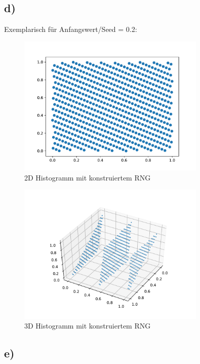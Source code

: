\subsection{d)}
Exemplarisch für Anfangswert/Seed = 0.2:

\begin{figure}[H]
  \centering
  \includegraphics[width=0.8\textwidth]{nr8_d_2D_seed=0.2.pdf}
  \caption{2D Histogramm mit konstruiertem RNG}
\end{figure}

\begin{figure}[H]
  \centering
  \includegraphics[width=0.8\textwidth]{nr8_d_3D_seed=0.2.pdf}
  \caption{3D Histogramm mit konstruiertem RNG}
\end{figure}

\subsection{e)}

